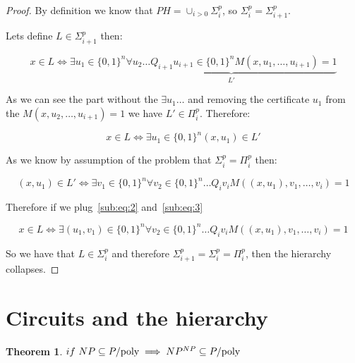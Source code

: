 \documentclass[12pt, a4paper]{article}
\begin{document}
\begin{proof}
  By definition we know that $PH = \cup_{i>0} \Sigma_i^p$, so $\Sigma_i^p = \Sigma_{i+1}^p$.

  Lets define $L \in \Sigma_{i+1}^p$ then:

  \begin{equation}
  x \in L \iff \exists u_1 \in \{0,1\}^n \underbrace{\forall u_2 \dots Q_{i+1} u_{i+1} \in \{0,1\}^n M(x, u_1, \dots, u_{i+1})=1}_{L'}
  \end{equation}

  As we can see the part without the $\exists u_1 \dots$ and removing the certificate $u_1$ from the $M(x, u_2, \dots, u_{i+1}) = 1$ we have $L' \in \Pi_i^p$. Therefore:

  \begin{equation}
    x \in L \iff \exists u_1 \in \{0,1\}^n (x,u_1) \in L'\label{sub:eq:2}
  \end{equation}

  As we know by assumption of the problem that $\Sigma_i^p = \Pi_i^p$ then:

  \begin{equation}
    (x,u_1) \in L' \iff \exists v_1 \in \{0,1\}^n \forall v_2 \in \{0,1\}^n \dots Q_i v_i M((x,u_1), v_1, \dots, v_i)=1\label{sub:eq:3}
  \end{equation}

  Therefore if we plug~\ref{sub:eq:2} and~\ref{sub:eq:3}

 \begin{equation}
    x \in L \iff \exists (u_1,v_1)
\in \{0,1\}^n \forall v_2 \in \{0,1\}^n \dots Q_i v_i M((x,u_1), v_1, \dots, v_i)=1
  \end{equation}

  So we have that $L \in \Sigma_i^p$ and therefore $\Sigma_{i+1}^p = \Sigma_i^p = \Pi_i^p$, then the hierarchy collapses.

\end{proof}


\section{Circuits and the hierarchy}
\newtheorem{npnp}{Theorem}
\begin{npnp}
 $\\if\ NP \subseteq P/\text{poly} \implies NP^{NP} \subseteq P/\text{poly}$
\end{npnp}
\end{document}
